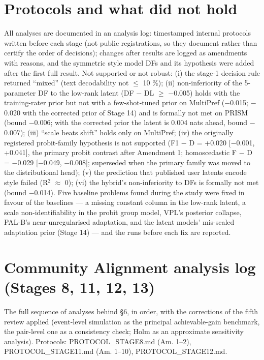 \documentclass{article}
\begin{document}
\section{Protocols and what did not hold}

All analyses are documented in an analysis log: timestamped internal protocols written before each stage (not public registrations, so they document rather than certify the order of decisions); changes after results are logged as amendments with reasons, and the symmetric style model DFs and its hypothesis were added after the first full result. Not supported or not robust: (i) the stage-1 decision rule returned ``mixed'' (text decodability not $\leq$ 10 \%); (ii) non-inferiority of the 5-parameter DF to the low-rank latent (DF $-$ DL $\geq$ $-$0.005) holds with the training-rater prior but not with a few-shot-tuned prior on MultiPref ($-$0.015; $-$0.020 with the corrected prior of Stage 14) and is formally not met on PRISM (bound $-$0.006; with the corrected prior the latent is 0.004 nats ahead, bound $-$0.007); (iii) ``scale beats shift'' holds only on MultiPref; (iv) the originally registered probit-family hypothesis is not supported (F1 $-$ D = +0.020 {[}$-$0.001, +0.041{]}, the primary probit contrast after Amendment 1; homoscedastic F $-$ D = $-$0.029 {[}$-$0.049, $-$0.008{]}; superseded when the primary family was moved to the distributional head); (v) the prediction that published user latents encode style failed (R$^2$ $\approx$ 0); (vi) the hybrid's non-inferiority to DFs is formally not met (bound $-$0.014). Five baseline problems found during the study were fixed in favour of the baselines --- a missing constant column in the low-rank latent, a scale non-identifiability in the probit group model, VPL's posterior collapse, PAL-B's near-unregularised adaptation, and the latent models' mis-scaled adaptation prior (Stage 14) --- and the runs before each fix are reported.

\section{Community Alignment analysis log (Stages 8, 11, 12, 13)}

The full sequence of analyses behind \S{}6, in order, with the corrections of the fifth review applied (event-level simulation as the principal achievable-gain benchmark, the pair-level one as a consistency check; Holm as an approximate sensitivity analysis). Protocols: PROTOCOL\_STAGE8.md (Am. 1--2), PROTOCOL\_STAGE11.md (Am. 1--10), PROTOCOL\_STAGE12.md.
\end{document}
